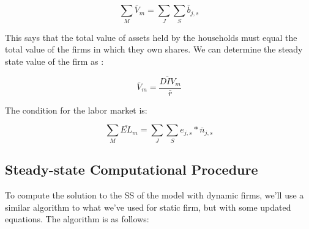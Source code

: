 \documentclass[letterpaper,12pt]{article}
\theoremstyle{definition}
\begin{document}
\begin{spacing}{1.5}
\begin{equation}
\sum_{M} \bar{V}_{m} = \sum_{J}\sum_{S}\bar{b}_{j,s}
\end{equation}

\noindent\noindent This says that the total value of assets held by the households must equal the total value of the firms in which they own shares. We can determine the steady state value of the firm as :

\begin{equation}
\label{eqn:solve_firm_value}
\bar{V}_{m} =\frac{\overline{DIV}_{m}}{\bar{r}}
\end{equation}

The condition for the labor market is: 

\begin{equation}
\sum_{M} \overline{EL}_{m} = \sum_{J}\sum_{S}e_{j,s}*\bar{n}_{j,s}
\end{equation}

\subsection*{Steady-state Computational Procedure}

To compute the solution to the SS of the model with dynamic firms, we'll use a similar algorithm to what we've used for static firm, but with some updated equations.  The algorithm is as follows:


\end{spacing}
\end{document}
